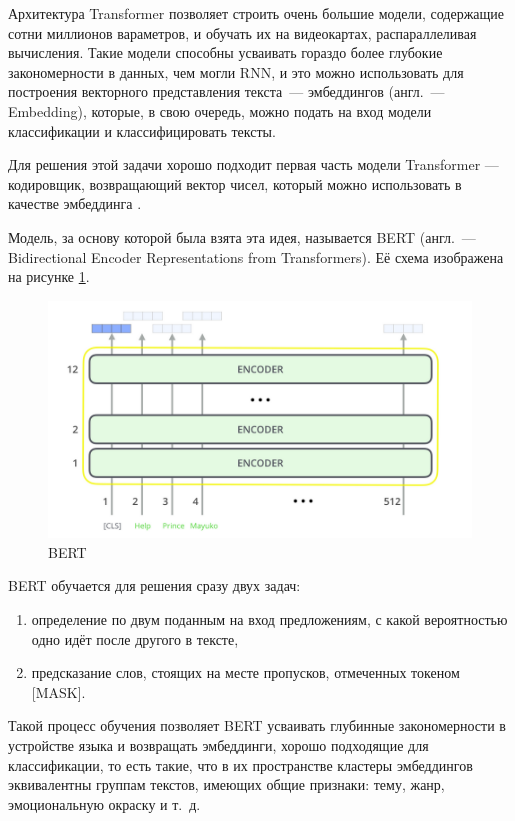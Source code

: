 Архитектура Transformer позволяет строить очень большие модели, содержащие сотни миллионов вараметров, и обучать их на видеокартах, распараллеливая вычисления. Такие модели способны усваивать гораздо более глубокие закономерности в данных, чем могли RNN, и это можно использовать для построения векторного представления текста --- эмбеддингов (англ. --- Embedding), которые, в свою очередь, можно подать на вход модели классификации и классифицировать тексты.

Для решения этой задачи хорошо подходит первая часть модели Transformer --- кодировщик, возвращающий вектор чисел, который можно использовать в качестве эмбеддинга \cite{art:bert}.

Модель, за основу которой была взята эта идея, называется BERT (англ. --- Bidirectional Encoder Representations from Transformers). Её схема изображена на рисунке \ref*{fig:bert}.

\begin{figure}[H]
    \centering
    \includegraphics[width=\textwidth]{../inc/images/bert.png}
    \caption{BERT}
    \label{fig:bert}
\end{figure}

BERT обучается для решения сразу двух задач:
\begin{enumerate}
    \item определение по двум поданным на вход предложениям, с какой вероятностью одно идёт после другого в тексте,
    \item предсказание слов, стоящих на месте пропусков, отмеченных токеном [MASK].
\end{enumerate}

Такой процесс обучения позволяет BERT усваивать глубинные закономерности в устройстве языка и возвращать эмбеддинги, хорошо подходящие для классификации, то есть такие, что в их пространстве кластеры эмбеддингов эквивалентны группам текстов, имеющих общие признаки: тему, жанр, эмоциональную окраску и т. д.

